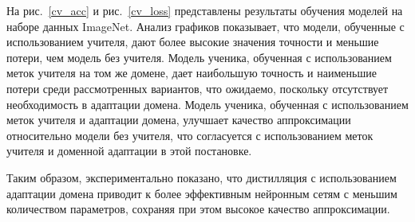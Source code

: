 На рис.~\ref{cv_acc} и рис.~\ref{cv_loss} представлены результаты обучения моделей на наборе данных ImageNet. Анализ графиков показывает, что модели, обученные с использованием учителя, дают более высокие значения точности и меньшие потери, чем модель без учителя. Модель ученика, обученная с использованием меток учителя на том же домене, дает наибольшую точность и наименьшие потери среди рассмотренных вариантов, что ожидаемо, поскольку отсутствует необходимость в адаптации домена. Модель ученика, обученная с использованием меток учителя и адаптации домена, улучшает качество аппроксимации относительно модели без учителя, что согласуется с использованием меток учителя и доменной адаптации в этой постановке.

Таким образом, экспериментально показано, что дистилляция с использованием адаптации домена приводит к более эффективным нейронным сетям с меньшим количеством параметров, сохраняя при этом высокое качество аппроксимации.

\begin{table}[h!t]
\begin{center}
\caption{Сравнение качества моделей для задачи компьютерного зрения на наборе данных ImageNet. Показаны валидационная точность, потери и интегральный критерий для различных комбинаций учителя и ученика с использованием доменной адаптации и без нее, результаты усреднены по нескольким запускам.}
\label{table_4}
\end{center}
\end{table}


